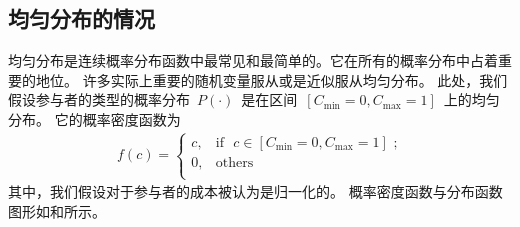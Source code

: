 \subsection{均匀分布的情况}
均匀分布是连续概率分布函数中最常见和最简单的。它在所有的概率分布中占着重要的地位。
许多实际上重要的随机变量服从或是近似服从均匀分布。
此处，我们假设参与者的类型的概率分布~$P(\cdot)$~是在区间~$[C_{\min}=0, C_{\max}=1]$~上的均匀分布。
它的概率密度函数为
\begin{align}
    f(c) = \begin{cases} c, &\text{if ~$c \in [C_{\min}=0, C_{\max}=1]$~;}\\
        0, &\text{others}\\ 
    \end{cases} 
    \label{eqn_equilibrium_prob} 
\end{align}
其中，我们假设对于参与者的成本被认为是归一化的。
概率密度函数与分布函数图形如和所示。
